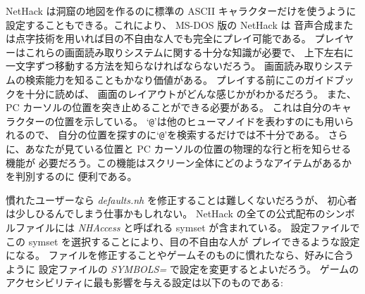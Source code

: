 NetHack は洞窟の地図を作るのに標準の ASCII キャラクターだけを使うように
設定することもできる。これにより、 MS-DOS 版の NetHack は
音声合成または点字技術を用いれば目の不自由な人でも完全にプレイ可能である。
プレイヤーはこれらの画面読み取りシステムに関する十分な知識が必要で、
上下左右に一文字ずつ移動する方法を知らなければならないだろう。
画面読み取りシステムの検索能力を知ることもかなり価値がある。
プレイする前にこのガイドブックを十分に読めば、
画面のレイアウトがどんな感じかがわかるだろう。
また、 PC カーソルの位置を突き止めることができる必要がある。
これは自分のキャラクターの位置を示している。
`{\tt @}'は他のヒューマノイドを表わすのにも用いられるので、
自分の位置を探すのに`{\tt @}'を検索するだけでは不十分である。
さらに、あなたが見ている位置と PC カーソルの位置の物理的な行と桁を知らせる機能が
必要だろう。この機能はスクリーン全体にどのようなアイテムがあるかを判別するのに
便利である。

慣れたユーザーなら {\it defaults.nh\/} を修正することは難しくないだろうが、
初心者は少しひるんでしまう仕事かもしれない。
NetHack の全ての公式配布のシンボルファイルには
{\it NHAccess\/} と呼ばれる symset が含まれている。
設定ファイルでこの symset を選択することにより、目の不自由な人が
プレイできるような設定になる。
ファイルを修正することやゲームそのものに慣れたなら、好みに合うように
設定ファイルの {\it SYMBOLS=\/} で設定を変更するとよいだろう。
ゲームのアクセシビリティに最も影響を与える設定は以下のものである:


